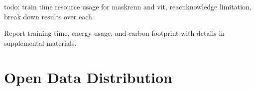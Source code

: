 \documentclass[10pt,twocolumn,letterpaper]{article}
\begin{document}
todo: train time resource usage for maskrcnn and vit, reacnknowledge
limitation, break down results over each.

Report training time, energy usage, and carbon footprint with details in supplemental materials.





\section{Open Data Distribution}
\label{sec:distribution}

  




\end{document}
